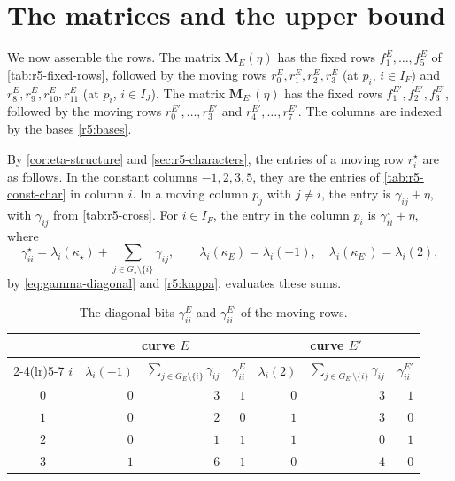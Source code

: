 \documentclass[12pt,oneside,openany]{book}
\theoremstyle{definition}
\theoremstyle{plain}
\numberwithin{equation}{chapter}
\theoremstyle{plain}
\theoremstyle{definition}
\theoremstyle{remark}
\begin{document}
\section{The matrices and the upper bound}\label{sec:r5-matrices}

We now assemble the rows. The matrix $\mathbf M_E(\eta)$ has the fixed rows $f^E_1,\dots,f^E_5$ of \cref{tab:r5-fixed-rows}, followed by the moving rows $r^E_0,r^E_1,r^E_2,r^E_3$ (at $p_i$, $i\in I_F$) and $r^E_8,r^E_9,r^E_{10},r^E_{11}$ (at $p_i$, $i\in I_J$). The matrix $\mathbf M_{E'}(\eta)$ has the fixed rows $f^{E'}_1,f^{E'}_2,f^{E'}_3$, followed by the moving rows $r^{E'}_0,\dots,r^{E'}_3$ and $r^{E'}_4,\dots,r^{E'}_7$. The columns are indexed by the bases \eqref{r5:bases}.

By \cref{cor:eta-structure} and \cref{sec:r5-characters}, the entries of a moving row $r^\star_i$ are as follows. In the constant columns $-1,2,3,5$, they are the entries of \cref{tab:r5-const-char} in column $i$. In a moving column $p_j$ with $j\ne i$, the entry is $\gamma_{ij}+\eta$, with $\gamma_{ij}$ from \cref{tab:r5-cross}. For $i\in I_F$, the entry in the column $p_i$ is $\gamma^\star_{ii}+\eta$, where
\[
\gamma^\star_{ii}=\lambda_i(\kappa_\star)+\sum_{j\in G_\star\setminus\{i\}}\gamma_{ij},\qquad \lambda_i(\kappa_E)=\lambda_i(-1),\quad\lambda_i(\kappa_{E'})=\lambda_i(2),
\]
by \eqref{eq:gamma-diagonal} and \eqref{r5:kappa}.  evaluates these sums.

\begin{table}[htbp]
\centering
\caption{The diagonal bits $\gamma^E_{ii}$ and $\gamma^{E'}_{ii}$ of the moving rows.}\label{tab:r5-diagonal}
\begin{tabular}{crrrrrr}
\toprule
& \multicolumn{3}{c}{curve $E$} & \multicolumn{3}{c}{curve $E'$}\\
\cmidrule(lr){2-4}\cmidrule(lr){5-7}
$i$ & $\lambda_i(-1)$ & $\sum_{j\in G_E\setminus\{i\}}\gamma_{ij}$ & $\gamma^E_{ii}$ & $\lambda_i(2)$ & $\sum_{j\in G_{E'}\setminus\{i\}}\gamma_{ij}$ & $\gamma^{E'}_{ii}$\\
\midrule
$0$ & $0$ & $3$ & $1$ & $0$ & $3$ & $1$\\
$1$ & $0$ & $2$ & $0$ & $1$ & $3$ & $0$\\
$2$ & $0$ & $1$ & $1$ & $1$ & $0$ & $1$\\
$3$ & $1$ & $6$ & $1$ & $0$ & $4$ & $0$\\
\bottomrule
\end{tabular}
\end{table}
\end{document}

